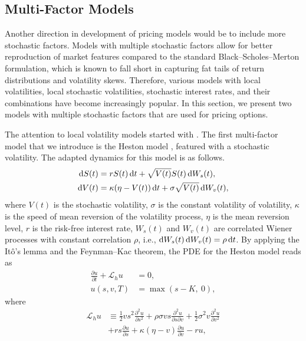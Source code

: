 \documentclass{UUThesisTemplate}
\begin{document}
\subsection{Multi-Factor Models}
\label{sub:multifactor}
\par Another direction in development of pricing models would be to include more stochastic factors. Models with multiple stochastic factors allow for better reproduction of market features compared to the standard Black--Scholes--Merton formulation, which is known to fall short in capturing fat tails of return distributions and volatility skews. Therefore, various models with local volatilities, local stochastic volatilities, stochastic interest rates, and their combinations have become increasingly popular. In this section, we present two models with multiple stochastic factors that are used for pricing options.
\par The attention to local volatility models started with \cite{dupire1994pricing}. The first multi-factor model that we introduce is the Heston model \cite{heston1993closed}, featured with a stochastic volatility. The adapted dynamics for this model is as follows.
\begin{align}
\dif S(t) & =  rS(t)\dif t + \sqrt{V(t)} S(t) \dif W_s(t), \label{qlsvSDE1} \\
\dif V(t) & =  \kappa(\eta-V(t))\dif t + \sigma \sqrt{V(t)}\dif W_v(t), \label{qlsvSDE2}
\end{align}
where $V(t)$ is the stochastic volatility, $\sigma$ is the constant volatility of volatility, $\kappa$ is the speed of mean reversion of the volatility process, $\eta$ is the mean reversion level, $r$ is the risk-free interest rate, $W_s(t)$ and $W_v(t)$ are correlated Wiener processes with constant correlation $\rho$, i.e., $\dif W_s(t) \dif W_v(t) = \rho \dif t$. By applying the It\^{o}'s lemma and the Feynman--Kac theorem, the PDE for the Heston model reads as
\begin{align}
\frac{\partial u}{\partial t}+\mathcal{L}_h u&=0, \nonumber \\
u(s,v,T) &= \max(s-K,\ 0), \label{hstPDE}
\end{align}
where
\begin{align}
\mathcal{L}_{h} u &\equiv \frac{1}{2}vs^2\frac{\partial^2 u}{\partial s^2} + \rho\sigma v s \frac{\partial^2 u}{\partial s\partial v} + \frac{1}{2}\sigma^2v\frac{\partial^2 u}{\partial v^2} \nonumber \\ 
			   &+ rs\frac{\partial u}{\partial s} + \kappa(\eta-v)\frac{\partial u}{\partial v} - ru, \label{eqHSTop}
\end{align}
\end{document}

